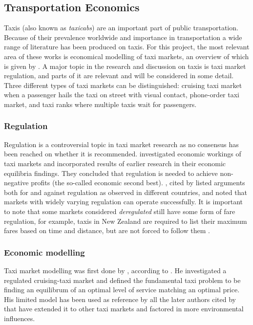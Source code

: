 \subsection{Transportation Economics}
\label{sec:literature:taxis}

Taxis (also known as \textit{taxicabs}) are an important part of public
transportation. Because of their prevalence worldwide and importance in
transportation a wide range of literature has been produced on taxis. For this
project, the most relevant area of these works is economical modelling of taxi
markets, an overview of which is given by \textcite{Salanova2011taxi+review}. A
major topic in the research and discussion on taxis is taxi market regulation,
and parts of it are relevant and will be considered in some detail. Three
different types of taxi markets can be distinguished: cruising taxi market when
a passenger hails the taxi on street with visual contact, phone-order taxi
market, and taxi ranks where multiple taxis wait for passengers.


\subsubsection{Regulation}

Regulation is a controversial topic in taxi market research as no consensus has
been reached on whether it is recommended.
\textcite{Cairns1996taxi+competition} investigated economic workings of taxi
markets and incorporated results of earlier research in their economic
equilibria findings. They concluded that regulation is needed to achieve non-
negative profits (the so-called economic second best).
\textcite{Oecd2007taxi+policy}, cited by \textcite{Salanova2011taxi+review}
listed arguments both for and against regulation as observed in different
countries, and noted that markets with widely varying regulation can operate
successfully. It is important to note that some markets considered
\textit{deregulated} still have some form of fare regulation, for example,
taxis in New Zealand are required to list their maximum fares based on time and
distance, but are not forced to follow them
\parencite{Gaunt1995taxi+newzealand}.


\subsubsection{Economic modelling} 
\label{sec:literature:taxis:modelling}

Taxi market modelling was first done by \textcite{Douglas1972taxi+regulation},
according to \textcite{Salanova2011taxi+review}. He investigated a regulated
cruising-taxi market and defined the fundamental taxi problem to be finding an
equilibrum of an optimal level of service matching an optimal price. His
limited model has been used as reference by all the later authors cited by
\textcite{Salanova2011taxi+review} that have extended it to other taxi markets
and factored in more environmental influences.


